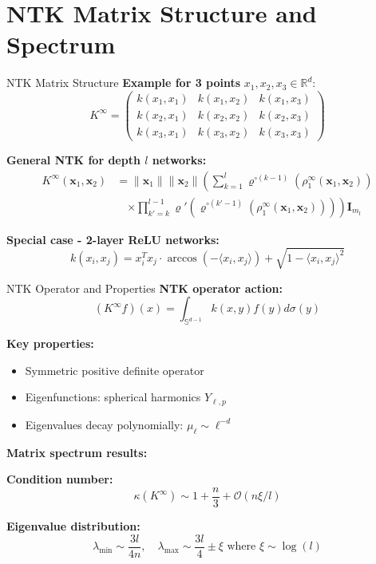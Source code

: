 \documentclass{beamer}
\begin{document}
\section{NTK Matrix Structure and Spectrum}

\begin{frame}{NTK Matrix Structure}
\textbf{Example for 3 points} $x_1, x_2, x_3 \in \mathbb{R}^d$:
\[
K^{\infty} = \begin{pmatrix} 
k(x_1,x_1) & k(x_1,x_2) & k(x_1,x_3) \\
k(x_2,x_1) & k(x_2,x_2) & k(x_2,x_3) \\
k(x_3,x_1) & k(x_3,x_2) & k(x_3,x_3)
\end{pmatrix}
\]

\textbf{General NTK for depth $l$ networks:}
\begin{align*}
K^{\infty}(\mathbf{x}_1, \mathbf{x}_2) &= \|\mathbf{x}_1\| \|\mathbf{x}_2\| \left( \sum_{k=1}^l \varrho^{\circ (k-1)}\left(\rho_1^{\infty}(\mathbf{x}_1, \mathbf{x}_2)\right) \right. \\
&\quad \left. \times \prod_{k'=k}^{l-1} \varrho'\left(\varrho^{\circ (k'-1)}\left(\rho_1^{\infty}(\mathbf{x}_1, \mathbf{x}_2)\right)\right) \right) \mathbf{I}_{m_l}
\end{align*}

\textbf{Special case - 2-layer ReLU networks:}
\[
k(x_i,x_j) = x_i^T x_j \cdot \arccos(-\langle x_i,x_j \rangle) + \sqrt{1-\langle x_i,x_j \rangle^2}
\]
\end{frame}

\begin{frame}{NTK Operator and Properties}
\textbf{NTK operator action:}
\[
(K^{\infty} f)(x) = \int_{\mathbb{S}^{d-1}} k(x,y)f(y)d\sigma(y)
\]

\textbf{Key properties:}
\begin{itemize}
\item Symmetric positive definite operator
\item Eigenfunctions: spherical harmonics $Y_{\ell,p}$
\item Eigenvalues decay polynomially: $\mu_\ell \sim \ell^{-d}$
\end{itemize}

\textbf{Matrix spectrum results:}

\textbf{Condition number:}
\[ \kappa(K^{\infty}) \sim 1 + \frac{n}{3} + \mathcal{O}(n \xi / l) \]

\textbf{Eigenvalue distribution:}
\[ \lambda_{\text{min}} \sim \frac{3l}{4n}, \quad \lambda_{\text{max}} \sim \frac{3l}{4} \pm \xi \text{ where } \xi \sim \log(l) \]
\end{frame}
\end{document}
